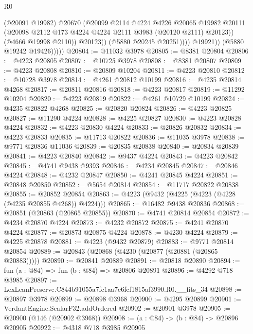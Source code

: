 \begin{lexlean}{R0}
\begin{coremodule}
                            (@20091 @19982)
                            @20670
                            (@20099
                              @2114
                              @4224
                              @4226
                              @20065
                              @19982
                              @20111
                              (@20098 @2112 @173 @4224 @4224 @2111 @3983 (@20120 @2111) @20123))
                            (@4666 @19998 @2110))
                          @20123))
                      (@5880 @20245 @20251))))
                @19921))
            (@5880 @19242 @19426)))))
@20804 := @11032 @3978
@20805 := @8381 @20804
@20806 := @4223 @20805
@20807 := @10725 @3978
@20808 := @8381 @20807
@20809 := @4223 @20808
@20810 := @20809 @10204
@20811 := @4223 @20810
@20812 := @10728 @3978
@20814 := @4261 @20812 @10199
@20816 := @4235 @20814 @4268
@20817 := @20811 @20816
@20818 := @4223 @20817
@20819 := @11292 @10204
@20820 := @4223 @20819
@20822 := @4261 @10729 @10199
@20824 := @4235 @20822 @4268
@20825 := @20820 @20824
@20826 := @4223 @20825
@20827 := @11290 @4224
@20828 := @4225 @20827
@20830 := @4223 @20828 @4224
@20832 := @4223 @20830 @4224
@20833 := @20826 @20832
@20834 := @4223 @20833
@20835 := @11713 @20822
@20836 := @11035 @3978
@20838 := @9771 @20836 @11036
@20839 := @20835 @20838
@20840 := @20834 @20839
@20841 := @4223 @20840
@20842 := @9437 @4224
@20843 := @4223 @20842
@20845 := @4741 @9438 @9393
@20846 := @4234 @20845
@20847 := @20846 @4224
@20848 := @4232 @20847
@20850 := @4241 @20845 @4224
@20851 := @20848 @20850
@20852 := @5654 @20814
@20854 := @11717 @20822 @20838
@20855 := @20852 @20854
@20863 := @4223 (@9432 (@4225 (@4223 (@4228 (@4235 @20855 @4268)) @4224)))
@20865 := @16482 @9438 @20836
@20868 := @20851 (@20863 (@20865 @20855))
@20870 := @4741 @20814 @20854
@20872 := @4234 @20870 @4224
@20873 := @4232 @20872
@20875 := @4241 @20870 @4224
@20877 := @20873 @20875 @4224
@20878 := @4230 @4224
@20879 := @4225 @20878
@20881 := @4223 (@9432 @20879)
@20883 := @9771 @20814 @20854
@20889 := @20843 (@20868 (@4230 (@20877 (@20881 (@20865 @20883)))))
@20890 := @20841 @20889
@20891 := @20818 @20890
@20894 := fun (a : @84) => fun (b : @84) => @20806 @20891
@20896 := @4292 @718 @3985
@20897 := LexLeanPreserve.C844b91055a7fc1aa7e6fef1815af3990.R0.__fits_34
@20898 := @20897 @3978
@20899 := @20898 @3968
@20900 := @4295 @20899
@20901 := VerdantEngine.ScalarF32.addOrdered
@20902 := @20901 @3978
@20905 := @20900 (@146 (@20902 @3968))
@20908 := (a : @84) -> (b : @84) -> @20896 @20905
@20922 := @4318
    @718
    @3985
    @20905

\end{coremodule}
\end{lexlean}
